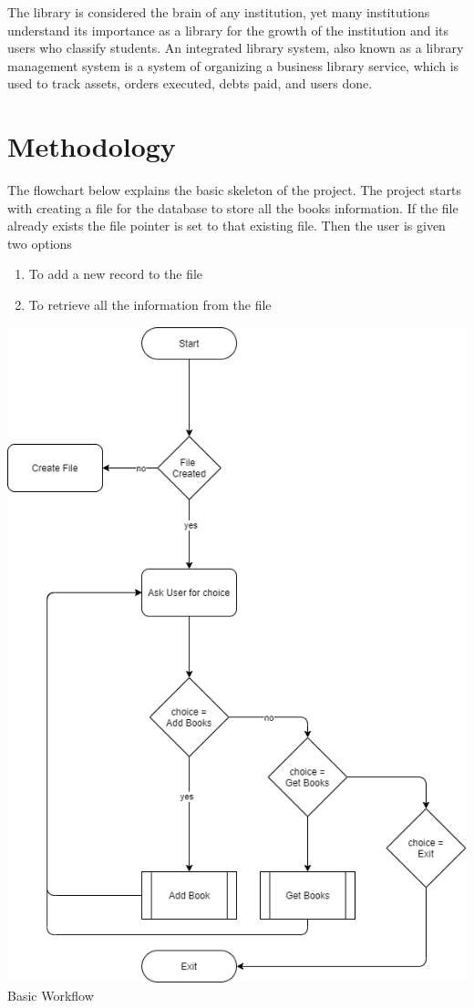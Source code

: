 \documentclass[conference]{IEEEtran}
\newenvironment{Figure}
  {\par\medskip\noindent\minipage{\linewidth}}
  {\endminipage\par\medskip}
\begin{document}
The library is considered the brain of any institution, yet many 
institutions understand its importance as a library for the growth of the 
institution and its users who classify students. An integrated library system, 
also known as a library management system is a system of organizing a business 
library service, which is used to track assets, orders executed, debts paid, and 
users done.\cite{[4]}
\pagebreak
\section{Methodology}
The flowchart below explains the basic skeleton of the project.
The project starts with creating a file for the database to store
all the books information. If the file already exists the file pointer
is set to that existing file. Then the user is given two options
\begin{enumerate}
    \item To add a new record to the file
    \item To retrieve all the information from the file
\end{enumerate}
\begin{Figure}
    \centering
    \includegraphics[width=\linewidth]{../resources/flowchart/working.drawio.png}
    \figurename{Basic Workflow}
\end{Figure}
\end{document}
